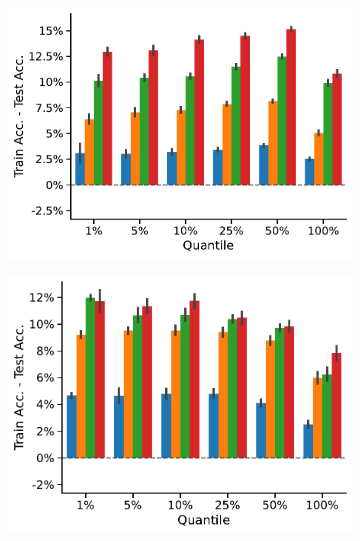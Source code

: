 \begin{figure}[htb]
\begin{subfigure}[b]{0.3\textwidth}
		\vspace*{-4ex} 
		\caption{\imdb}
	\end{subfigure}
	\hfill
	\begin{subfigure}[b]{0.3\textwidth}
		\centering
		\includegraphics[width=\textwidth]{Figures/train_test_diff_k_wl_MUTAG.pdf}
		\vspace*{-4ex} 
		\caption{\mutag}
	\end{subfigure}
	\par\bigskip
	\begin{subfigure}[b]{0.3\textwidth}
		\centering
		\includegraphics[width=\textwidth]{Figures/train_test_diff_k_wl_NCI1.pdf}
		\vspace*{-4ex} 
		\caption{\nci}
	\end{subfigure}

\end{figure}
